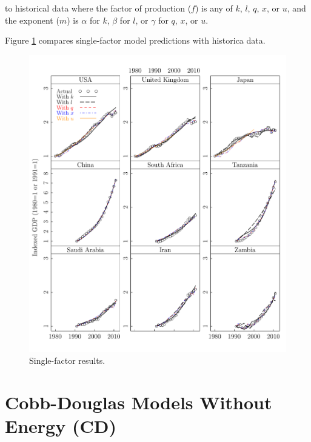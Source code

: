 \documentclass[preprint,authoryear,12pt]{elsarticle}\usepackage{graphicx, color}
\makeatletter
\def\maxwidth{ %
  \ifdim\Gin@nat@width>\linewidth
    \linewidth
  \else
    \Gin@nat@width
  \fi
}
\newenvironment{knitrout}{}{} %
\makeatother
\begin{document}
\noindent to historical data where the factor of production ($f$) is any of $k$, $l$, $q$, $x$, or $u$, and the exponent ($m$) is $\alpha$ for $k$, $\beta$ for $l$, or $\gamma$ for $q$, $x$, or $u$.

Figure \ref{fig:SF_GDP_Lattice_Graph} compares single-factor model predictions with historica data.

\begin{knitrout}
\color{fgcolor}\begin{figure}[H]

\includegraphics[width=\maxwidth]{figure/SF_GDP_Lattice_Graph} \caption[Single-factor results]{Single-factor results.\label{fig:SF_GDP_Lattice_Graph}}
\end{figure}


\end{knitrout}


\section{Cobb-Douglas Models Without Energy (CD)}
\end{document}
